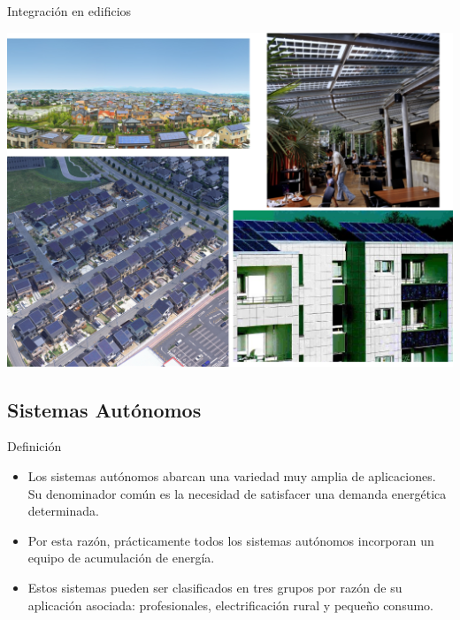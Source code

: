 \documentclass[xcolor={usenames,svgnames,dvipsnames}]{beamer}
\begin{document}
\begin{frame}[label={sec:orgaec891f}]{Integración en edificios}
\begin{center}
\includegraphics[width=.9\linewidth]{../figs/PVUrban.png}
\end{center}
\end{frame}

\subsection{Sistemas Autónomos}
\label{sec:org1120743}
\begin{frame}[label={sec:orge6f0fe4}]{Definición}
\begin{itemize}
\item Los sistemas autónomos abarcan una variedad muy amplia de
aplicaciones. Su denominador común es la necesidad de satisfacer una
demanda energética determinada.

\item Por esta razón, prácticamente todos los sistemas autónomos
incorporan un equipo de acumulación de energía.

\item Estos sistemas pueden ser clasificados en tres grupos por razón de
su aplicación asociada: profesionales, electrificación rural y
pequeño consumo.
\end{itemize}
\end{frame}
\end{document}
